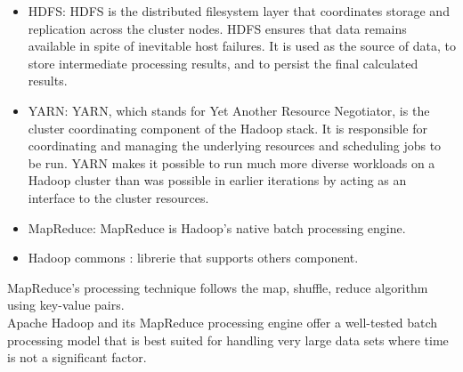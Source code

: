 \begin{itemize}
  \item HDFS: HDFS is the distributed filesystem layer that coordinates storage and replication across the cluster nodes. HDFS ensures that data remains available in spite of inevitable host failures. It is used as the source of data, to store intermediate processing results, and to persist the final calculated results.
  \item YARN: YARN, which stands for Yet Another Resource Negotiator, is the cluster coordinating component of the Hadoop stack. It is responsible for coordinating and managing the underlying resources and scheduling jobs to be run. YARN makes it possible to run much more diverse workloads on a Hadoop cluster than was possible in earlier iterations by acting as an interface to the cluster resources.
  \item MapReduce: MapReduce is Hadoop's native batch processing engine.
  \item Hadoop commons : librerie that supports others component.
\end{itemize}
MapReduce's processing technique follows the map, shuffle, reduce algorithm using key-value pairs.\\
Apache Hadoop and its MapReduce processing engine offer a well-tested batch processing model that is best suited for handling very large data sets where time is not a significant factor. 

